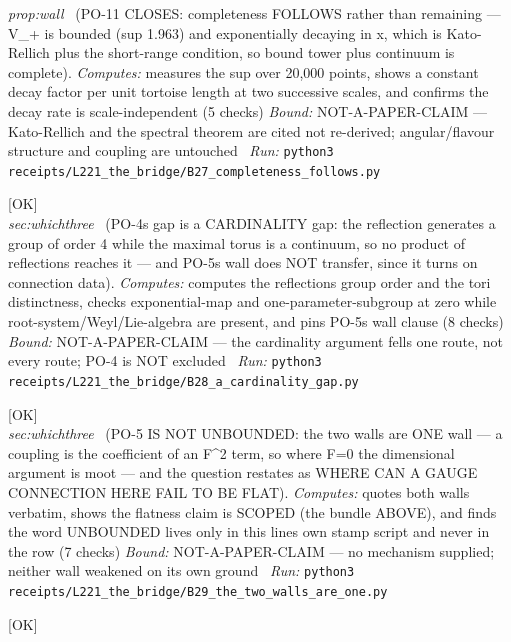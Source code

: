 \begin{description}
\textit{prop:wall} \ (PO-11 CLOSES: completeness FOLLOWS rather than remaining --- V\_+ is bounded (sup 1.963) and exponentially decaying in x, which is Kato-Rellich plus the short-range condition, so bound tower plus continuum is complete). 
\emph{Computes:} measures the sup over 20,000 points, shows a constant decay factor per unit tortoise length at two successive scales, and confirms the decay rate is scale-independent (5 checks)
 \emph{Bound:} NOT-A-PAPER-CLAIM --- Kato-Rellich and the spectral theorem are cited not re-derived; angular/flavour structure and coupling are untouched
\ \emph{Run:} \texttt{python3 receipts/L221\_the\_bridge/B27\_completeness\_follows.py}
\item[\label{rcpt:B28_a_cardinality_gap}\textbf{}\quad\texttt{B28\_a\_cardinality\_gap}]\hfill\textsf{[OK]}\\
\textit{sec:whichthree} \ (PO-4s gap is a CARDINALITY gap: the reflection generates a group of order 4 while the maximal torus is a continuum, so no product of reflections reaches it --- and PO-5s wall does NOT transfer, since it turns on connection data). 
\emph{Computes:} computes the reflections group order and the tori distinctness, checks exponential-map and one-parameter-subgroup at zero while root-system/Weyl/Lie-algebra are present, and pins PO-5s wall clause (8 checks)
 \emph{Bound:} NOT-A-PAPER-CLAIM --- the cardinality argument fells one route, not every route; PO-4 is NOT excluded
\ \emph{Run:} \texttt{python3 receipts/L221\_the\_bridge/B28\_a\_cardinality\_gap.py}
\item[\label{rcpt:B29_the_two_walls_are_one}\textbf{}\quad\texttt{B29\_the\_two\_walls\_are\_one}]\hfill\textsf{[OK]}\\
\textit{sec:whichthree} \ (PO-5 IS NOT UNBOUNDED: the two walls are ONE wall --- a coupling is the coefficient of an F\textasciicircum{}2 term, so where F=0 the dimensional argument is moot --- and the question restates as WHERE CAN A GAUGE CONNECTION HERE FAIL TO BE FLAT). 
\emph{Computes:} quotes both walls verbatim, shows the flatness claim is SCOPED (the bundle ABOVE), and finds the word UNBOUNDED lives only in this lines own stamp script and never in the row (7 checks)
 \emph{Bound:} NOT-A-PAPER-CLAIM --- no mechanism supplied; neither wall weakened on its own ground
\ \emph{Run:} \texttt{python3 receipts/L221\_the\_bridge/B29\_the\_two\_walls\_are\_one.py}
\item[\label{rcpt:B30_the_parameter_has_the_wrong_signature}\textbf{}\quad\texttt{B30\_the\_parameter\_has\_the\_wrong\_signature}]\hfill\textsf{[OK]}\\

\end{description}
